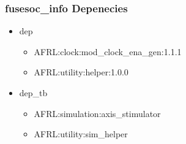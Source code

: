 \subsubsection{fusesoc\_info Depenecies}
\begin{itemize}
\item dep
	\begin{itemize}
	\item AFRL:clock:mod\_clock\_ena\_gen:1.1.1
	\item AFRL:utility:helper:1.0.0
	\end{itemize}
\item dep\_tb
	\begin{itemize}
	\item AFRL:simulation:axis\_stimulator
	\item AFRL:utility:sim\_helper
	\end{itemize}
\end{itemize}
